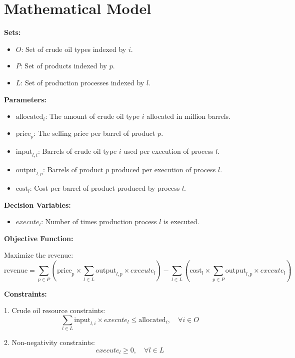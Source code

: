 \documentclass{article}
\begin{document}
\section*{Mathematical Model}

\textbf{Sets:}
\begin{itemize}
    \item $O$: Set of crude oil types indexed by $i$.
    \item $P$: Set of products indexed by $p$.
    \item $L$: Set of production processes indexed by $l$.
\end{itemize}

\textbf{Parameters:}
\begin{itemize}
    \item $\text{allocated}_i$: The amount of crude oil type $i$ allocated in million barrels.
    \item $\text{price}_p$: The selling price per barrel of product $p$.
    \item $\text{input}_{l,i}$: Barrels of crude oil type $i$ used per execution of process $l$.
    \item $\text{output}_{l,p}$: Barrels of product $p$ produced per execution of process $l$.
    \item $\text{cost}_l$: Cost per barrel of product produced by process $l$.
\end{itemize}

\textbf{Decision Variables:}
\begin{itemize}
    \item $execute_l$: Number of times production process $l$ is executed.
\end{itemize}

\textbf{Objective Function:}

Maximize the revenue:
\[
\text{revenue} = \sum_{p \in P} \left( \text{price}_p \times \sum_{l \in L} \text{output}_{l,p} \times execute_l \right) - \sum_{l \in L} \left( \text{cost}_l \times \sum_{p \in P} \text{output}_{l,p} \times execute_l \right)
\]

\textbf{Constraints:}

1. Crude oil resource constraints:
\[
\sum_{l \in L} \text{input}_{l,i} \times execute_l \leq \text{allocated}_i, \quad \forall i \in O
\]

2. Non-negativity constraints:
\[
execute_l \geq 0, \quad \forall l \in L
\]
\end{document}
